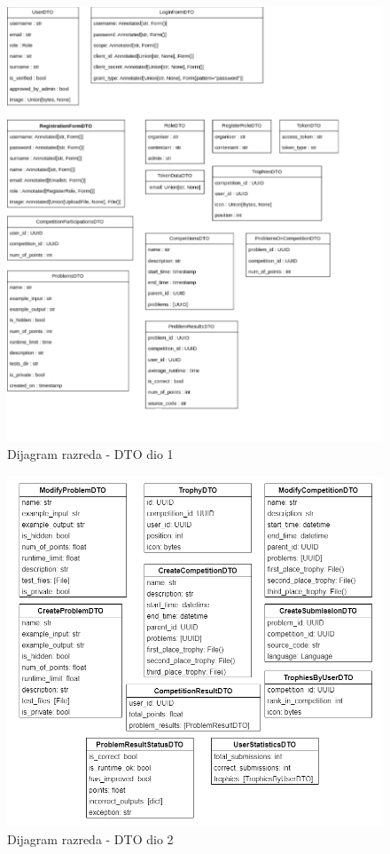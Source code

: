 			\begin{figure}[H]
				\centering
				\includegraphics[width=\linewidth]{slike/dto.png}
				\caption{Dijagram razreda - DTO dio 1}
				\label{fig:implenetacija2}
			\end{figure}
			
			\begin{figure}[H]
				\centering
				\includegraphics[width=\linewidth]{slike/dto_2.png}
				\caption{Dijagram razreda - DTO dio 2}
				\label{fig:implenetacija3}
			\end{figure}
			\eject
			
